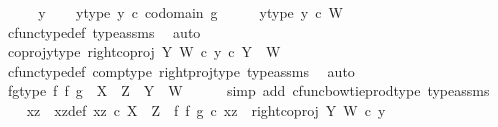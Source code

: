 \begin{isabellebody}
\ \isamarkupfalse%
\isanewline
{}\isamarkupfalse%
\isanewline
\ \ \isamarkupfalse%
\ y\isanewline
\ \ \isamarkupfalse%
\ y{\isacharunderscore}{\kern0pt}type{\isacharcolon}{\kern0pt}\ {\isachardoublequoteopen}y\ {\isasymin}\isactrlsub c\ codomain\ g{\isachardoublequoteclose}\isanewline
\ \ \isamarkupfalse%
\ \isamarkupfalse%
\ y{\isacharunderscore}{\kern0pt}type{}{\isacharcolon}{\kern0pt}\ {\isachardoublequoteopen}y\ {\isasymin}\isactrlsub c\ W{\isachardoublequoteclose}\isanewline
\ \ \ \ \isamarkupfalse%
\ cfunc{\isacharunderscore}{\kern0pt}type{\isacharunderscore}{\kern0pt}def\ type{\isacharunderscore}{\kern0pt}assms{\isacharparenleft}{\kern0pt}{}{\isacharparenright}{\kern0pt}\ \isamarkupfalse%
\ auto\ \isanewline
\ \ \isamarkupfalse%
\ \isamarkupfalse%
\ coproj{\isacharunderscore}{\kern0pt}y{\isacharunderscore}{\kern0pt}type{\isacharcolon}{\kern0pt}\ {\isachardoublequoteopen}{\isacharparenleft}{\kern0pt}right{\isacharunderscore}{\kern0pt}coproj\ Y\ W{\isacharparenright}{\kern0pt}\ {\isasymcirc}\isactrlsub c\ y\ {\isasymin}\isactrlsub c\ {\isacharparenleft}{\kern0pt}Y\ {\isasymCoprod}\ W{\isacharparenright}{\kern0pt}{\isachardoublequoteclose}\ \isanewline
\ \ \ \ \isamarkupfalse%
\ cfunc{\isacharunderscore}{\kern0pt}type{\isacharunderscore}{\kern0pt}def\ comp{\isacharunderscore}{\kern0pt}type\ right{\isacharunderscore}{\kern0pt}proj{\isacharunderscore}{\kern0pt}type\ type{\isacharunderscore}{\kern0pt}assms{\isacharparenleft}{\kern0pt}{}{\isacharparenright}{\kern0pt}\ \isamarkupfalse%
\ auto\isanewline
\ \ \isamarkupfalse%
\ fg{\isacharunderscore}{\kern0pt}type{\isacharcolon}{\kern0pt}\ {\isachardoublequoteopen}{\isacharparenleft}{\kern0pt}f\ {\isasymbowtie}\isactrlsub f\ g{\isacharparenright}{\kern0pt}\ {\isacharcolon}{\kern0pt}\ X\ {\isasymCoprod}\ Z\ {\isasymrightarrow}\ Y\ {\isasymCoprod}\ W{\isachardoublequoteclose}\isanewline
\ \ \ \ \isamarkupfalse%
\ {\isacharparenleft}{\kern0pt}simp\ add{\isacharcolon}{\kern0pt}\ cfunc{\isacharunderscore}{\kern0pt}bowtie{\isacharunderscore}{\kern0pt}prod{\isacharunderscore}{\kern0pt}type\ type{\isacharunderscore}{\kern0pt}assms{\isacharparenright}{\kern0pt}\isanewline
\ \ \isamarkupfalse%
\ xz\ \ xz{\isacharunderscore}{\kern0pt}def{\isacharcolon}{\kern0pt}\ {\isachardoublequoteopen}xz\ {\isasymin}\isactrlsub c\ X\ {\isasymCoprod}\ Z\ {\isasymand}\ {\isacharparenleft}{\kern0pt}f\ {\isasymbowtie}\isactrlsub f\ g{\isacharparenright}{\kern0pt}\ {\isasymcirc}\isactrlsub c\ xz\ {\isacharequal}{\kern0pt}\ right{\isacharunderscore}{\kern0pt}coproj\ Y\ W\ {\isasymcirc}\isactrlsub c\ y{\isachardoublequoteclose}\isanewline

\end{isabellebody}
